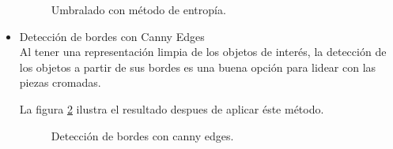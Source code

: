 \documentclass[a4paper, 11pt]{article}
\begin{document}
\begin{itemize}
  \begin{figure}[ht]%
    \centering
    \qquad
    \caption{Umbralado con método de entropía.}%
    \label{entropia}%
  \end{figure}

\item Detección de bordes con Canny Edges\\

  Al tener una representación limpia de los objetos de interés, la detección de los objetos a partir de sus bordes es una buena opción para lidear con las piezas cromadas.

  La figura \ref{canny} ilustra el resultado despues de aplicar éste método.
  
  \begin{figure}[ht]%
    \centering
    \qquad
    \caption{Detección de bordes con canny edges.}%
    \label{canny}%
  \end{figure}
  

\end{itemize}
\end{document}
